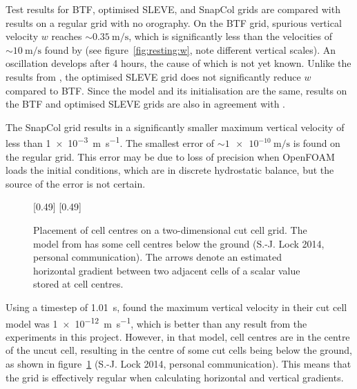 Test results for BTF, optimised SLEVE, and SnapCol grids are compared with results on a regular grid with no orography.  On the BTF grid, spurious vertical velocity $w$ reaches $\sim \SI{0.35}{\meter\per\second}$, which is significantly less than the velocities of $\sim \SI{10}{\meter\per\second}$ found by \textcite{klemp2011} (see figure~\ref{fig:resting:w}, note different vertical scales).  An oscillation develops after 4 hours, the cause of which is not yet known.  Unlike the results from \textcite{klemp2011}, the optimised SLEVE grid does not significantly reduce $w$ compared to BTF.  Since the model and its initialisation are the same, results on the BTF and optimised SLEVE grids are also in agreement with \textcite{weller-shahrokhi2014}.

The SnapCol grid results in a significantly smaller maximum vertical velocity of less than \SI{1e-3}{\meter\per\second}.  The smallest error of $\sim \SI{1e-10}{\meter\per\second}$ is found on the regular grid.  This error may be due to loss of precision when OpenFOAM loads the initial conditions, which are in discrete hydrostatic balance, but the source of the error is not certain.

\begin{figure}
	\captionsetup[subfigure]{position=b}
	\centering
	[0.49\textwidth]{}
	\hfill
	[0.49\textwidth]{}
%
	\caption{Placement of cell centres on a two-dimensional cut cell grid.  The model from \textcite{good2013} has some cell centres below the ground (S.-J. Lock 2014, personal communication).  The arrows denote an estimated horizontal gradient between two adjacent cells of a scalar value stored at cell centres.}
	\label{fig:resting:good}
\end{figure}

Using a timestep of \SI{1.01}{\second}, \textcite{good2013} found the maximum vertical velocity in their cut cell model was \SI{1e-12}{\meter\per\second}, which is better than any result from the experiments in this project.  However, in that model, cell centres are in the centre of the uncut cell, resulting in the centre of some cut cells being below the ground, as shown in figure~\ref{fig:resting:good} (S.-J. Lock 2014, personal communication).  This means that the grid is effectively regular when calculating horizontal and vertical gradients.

